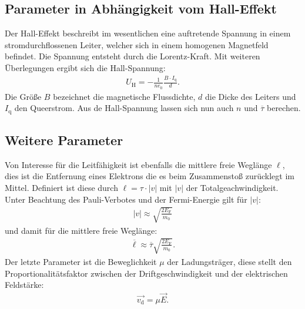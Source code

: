 \subsection{Parameter in Abhängigkeit vom Hall-Effekt}
Der Hall-Effekt beschreibt im wesentlichen eine auftretende Spannung in einem stromdurchflossenen Leiter, welcher sich in
einem homogenen Magnetfeld befindet. Die Spannung entsteht durch die Lorentz-Kraft.
Mit weiteren Überlegungen ergibt sich die Hall-Spannung:
\begin{align}
 U_\mathrm{H}=-\frac{1}{ne_0}\frac{B\cdot I_\mathrm{q}}{d}.
\end{align}
Die Größe $B$ bezeichnet die magnetische Flussdichte, $d$ die Dicke des Leiters und $I_\mathrm{q}$ den Queerstrom.
Aus de Hall-Spannung lassen sich nun auch $n$ und $\overline{\tau}$ berechen.

\subsection{Weitere Parameter}
Von Interesse für die Leitfähigkeit ist ebenfalls die mittlere freie Weglänge $\ell$, dies ist die Entfernung eines Elektrons die
es beim Zusammenstoß zurücklegt im Mittel. Definiert ist diese durch $\ell=\tau\cdot|v|$ mit $|v|$ der Totalgeachwindigkeit.
Unter Beachtung des Pauli-Verbotes und der Fermi-Energie gilt für $|v|$:
\begin{align}
 |v|\approx \sqrt{\frac{2E_\mathrm{F}}{m_0}}\label{eqn:v}
\end{align}
und damit für die mittlere freie Weglänge:
\begin{align}
\overline{\ell} \approx \overline{\tau}\sqrt{\frac{2 E_\mathrm{F}}{m_0}}.\label{eqn:l}
\end{align}
Der letzte Parameter ist die Beweglichkeit $\mu$ der Ladungsträger, diese stellt den Proportionalitätsfaktor
zwischen der Driftgeschwindigkeit und der elektrischen Feldstärke:
\begin{align}
\vec{v_\mathrm{d}}=\mu \vec{E}.
\end{align}
